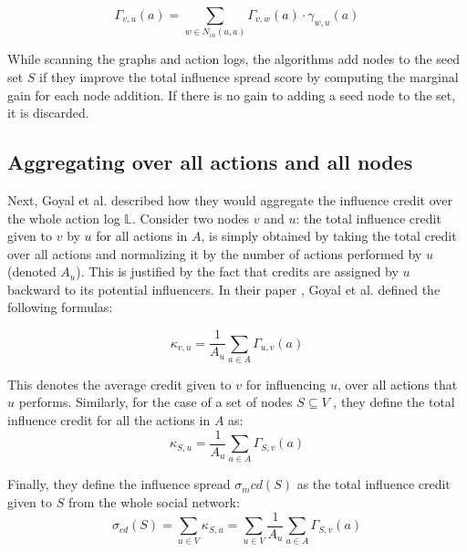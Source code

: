 \documentclass{acm_proc_article-sp}
\begin{document}
\begin{figure}[h]
	\begin{equation}
		\Gamma_{v,u}(a) = \displaystyle\sum_{w \in N_{in}(u,a)} \Gamma_{v,w}(a) \cdot \gamma_{w,u}(a)
	\end{equation}
	\label{CD-formula}
\end{figure}

While scanning the graphs and action logs, the algorithms add nodes to the seed set $S$ if they improve the total influence spread score by computing the marginal gain for each node addition. If there is no gain to adding a seed node to the set, it is discarded.

\subsection{Aggregating over all actions and all nodes}

Next, Goyal et al. described how they would aggregate the influence credit over the whole action log $\mathbb{L}$. Consider two nodes $v$ and $u$: the total influence credit given to $v$ by $u$ for all actions in $A$, is simply obtained by taking the total credit over all actions and normalizing it by the number of actions performed by $u$ (denoted $A_u$). This is justified by the fact that credits are assigned by $u$ backward to its potential influencers. In their paper \cite{goyal:datainfluence}, Goyal et al. defined the following formulas:

\begin{equation}
	\kappa_{v,u} = \frac{1}{A_u} \displaystyle\sum_{a \in A} \Gamma_{u,v}(a)
\end{equation}

\noindent This denotes the average credit given to $v$ for influencing $u$, over all actions that $u$ performs. Similarly, for the case of a set of nodes $S \subseteq V$ , they define the total influence credit for all the actions in $A$ as:
\begin{equation}
		\kappa_{S,u} = \frac{1}{A_u} \displaystyle\sum_{a \in A} \Gamma_{S,v}(a)
\end{equation}

\noindent Finally, they define the influence spread $\sigma_m{cd}(S)$ as the total influence credit given to $S$ from the whole social network:
\begin{equation}
	\sigma_{cd}(S) = \displaystyle\sum_{u\in V} \kappa_{S,u} = \displaystyle\sum_{u\in V} \frac{1}{A_u} \displaystyle\sum_{a \in A} \Gamma_{S,v}(a)
\end{equation}
\end{document}
